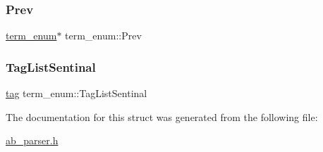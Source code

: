 \mbox{\label{structterm__enum_addad4748b3a035a56ed83b5389668f35}} 
\subsubsection{\texorpdfstring{Prev}{Prev}}
{\footnotesize\ttfamily \hyperlink{structterm__enum}{term\+\_\+enum}$\ast$ term\+\_\+enum\+::\+Prev}

\mbox{\label{structterm__enum_a064766a8666ff84a4571dff4d9a7070a}} 
\subsubsection{\texorpdfstring{Tag\+List\+Sentinal}{TagListSentinal}}
{\footnotesize\ttfamily \hyperlink{structtag}{tag} term\+\_\+enum\+::\+Tag\+List\+Sentinal}



The documentation for this struct was generated from the following file\+:\begin{DoxyCompactItemize}
\item 
\hyperlink{ab__parser_8h}{ab\+\_\+parser.\+h}\end{DoxyCompactItemize}
